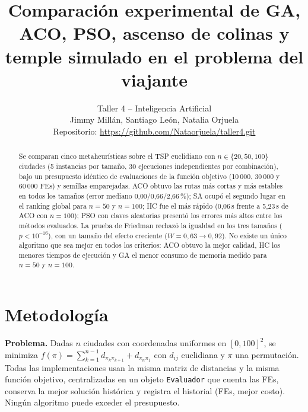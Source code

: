\documentclass[10pt,a4paper]{article}
\title{\textbf{Comparación experimental de GA, ACO, PSO, ascenso de colinas y temple simulado en el problema del viajante}}
\author{Taller 4 -- Inteligencia Artificial\\[0.35em]
\normalsize Jimmy Mill\'an, Santiago Le\'on, Natalia Orjuela\\[0.35em]
\small Repositorio: \url{https://github.com/Nataorjuela/taller4.git}}
\date{}
\begin{document}
\maketitle
\vspace{-2.5em}
\begin{abstract}
Se comparan cinco metaheurísticas sobre el TSP euclidiano con $n\in\{20,50,100\}$ ciudades (5 instancias por tamaño, 30 ejecuciones independientes por combinación),
bajo un presupuesto idéntico de evaluaciones de la función objetivo (10\,000, 30\,000 y 60\,000 FEs) y semillas emparejadas. ACO obtuvo las rutas más cortas y más estables en
todos los tamaños (error mediano 0{,}00/0{,}66/2{,}66\,\%); SA ocupó el segundo lugar en el ranking global para $n=50$ y $n=100$; HC fue el más rápido (0{,}06\,s frente a 5{,}23\,s de ACO con $n=100$);
PSO con claves aleatorias presentó los errores más altos entre los métodos evaluados. La prueba de Friedman rechazó la igualdad en los tres tamaños ($p<10^{-16}$), con un tamaño del efecto creciente
($W=0{,}63\to0{,}92$). No existe un único algoritmo que sea mejor en todos los criterios: ACO obtuvo la mejor calidad, HC los menores tiempos de ejecución y GA el menor consumo de memoria medido para $n=50$ y $n=100$.
\end{abstract}

\section{Metodología}
\textbf{Problema.} Dadas $n$ ciudades con coordenadas uniformes en $[0,100]^2$, se minimiza $f(\pi)=\sum_{k=1}^{n-1}d_{\pi_k\pi_{k+1}}+d_{\pi_n\pi_1}$ con $d_{ij}$ euclidiana y $\pi$ una permutación.
Todas las implementaciones usan la misma matriz de distancias y la misma función objetivo, centralizadas en un objeto \texttt{Evaluador} que cuenta las FEs, conserva la mejor solución histórica
y registra el historial (FEs, mejor costo). Ningún algoritmo puede exceder el presupuesto.
\end{document}
